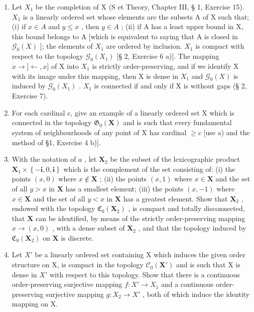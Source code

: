 \begin{enumerate}
\def\labelenumi{\alph{enumi})}
\item
  Let \(X_{1}\) be the completion of X (S et Theory, Chapter III, § 1, Exercise 15). \(X_{1}\) is a linearly ordered set whose elements are the subsets A of X such that; (i) if \(x \in A\) and \(y \leqslant x\) , then \(y \in A\) ; (ii) if A has a least upper bound in X, this bound belongs to A {[}which is equivalent to saying that A is closed in \(\mathcal{G}_{0}(X)\) {]}; the elements of \(X_{1}\) are ordered by inclusion. \(X_{1}\) is compact with respect to the topology \(\mathcal{G}_{0}(X_{1})\) {[}§ 2, Exercise 6 a){]}. The mapping \(x \to ]\leftarrow,x]\) of X into \(X_{1}\) is strictly order-preserving, and if we identify X with its image under this mapping, then X is dense in \(X_{1}\) and \(\mathcal{G}_{0}(X)\) is induced by \(\mathcal{G}_{0}(X_{1})\) . \(X_{1}\) is connected if and only if X is without gaps (§ 2, Exercise 7).
\item
  For each cardinal c, give an example of a linearly ordered set X which is connected in the topology \(\mathfrak{G}_{0}(\mathbf{X})\) and is such that every fundamental system of neighbourhoods of any point of X has cardinal \(\geqslant c\) {[}use a) and the method of §1, Exercise 4 b){]}.
\item
  With the notation of \(a\) , let \(\mathbf{X}_{2}\) be the subset of the lexicographic product \(\mathbf{X}_{1} \times \left\{-\mathbf{i}, 0, \mathbf{i}\right\}\) which is the complement of the set consisting of: (i) the points \((x, 0)\) where \(x \notin \mathbf{X}\) ; (ii) the points \((x, 1)\) where \(x \in \mathbf{X}\) and the set of all \(y > x\) in \(\mathbf{X}\) has a smallest element; (iii) the points \((x, -1)\) where \(x \in \mathbf{X}\) and the set of all \(y < x\) in \(\mathbf{X}\) has a greatest element. Show that \(\mathbf{X}_{2}\) , endowed with the topology \(\mathfrak{C}_{0}(\mathbf{X}_{2})\) , is compact and totally disconnected, that \(\mathbf{X}\) can be identified, by means of the strictly order-preserving mapping \(x \to (x, 0)\) , with a dense subset of \(\mathbf{X}_{2}\) , and that the topology induced by \(\mathfrak{C}_{0}(\mathbf{X}_{2})\) on \(\mathbf{X}\) is discrete.
\item
  Let \(X'\) be a linearly ordered set containing X which induces the given order structure on X, is compact in the topology \(\mathcal{C}_{0}(\mathbf{X}')\) and is such that X is dense in \(X'\) with respect to this topology. Show that there is a continuous order-preserving surjective mapping \(f: X' \to X_{1}\) and a continuous order-preserving surjective mapping \(g: X_{2} \to X'\) , both of which induce the identity mapping on X.
\end{enumerate}

